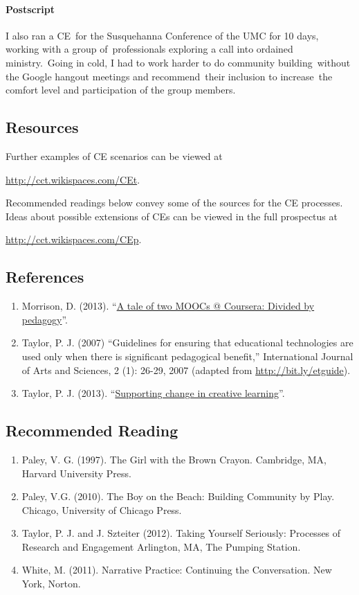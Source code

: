 \paragraph{Postscript}\label{postscript}

I also ran a CE~for the Susquehanna Conference of the UMC for 10 days,
working with a group of~professionals exploring a call into ordained
ministry.~Going in cold, I had to work harder to do community
building~without the Google hangout meetings and recommend~their
inclusion to increase~the comfort level and participation of the group
members.

\subsection{Resources}\label{resources}

Further examples of CE scenarios can be viewed at

\url{http://cct.wikispaces.com/CEt}.

\noindent Recommended readings below convey some of the sources for the CE
processes.~ Ideas about possible extensions of CEs can be viewed in the
full prospectus at

\url{http://cct.wikispaces.com/CEp}.

\subsection{References}\label{references}

\begin{enumerate}
\def\labelenumi{\arabic{enumi}.}
\item
  Morrison, D. (2013). ``\href{http://bit.ly/164uqkJ}{A tale of two
  MOOCs @ Coursera: Divided by pedagogy}''.
\item
  Taylor, P. J. (2007) ``Guidelines for ensuring that educational
  technologies are used only when there is significant pedagogical
  benefit,'' International Journal of Arts and Sciences, 2 (1): 26-29,
  2007 (adapted from \url{http://bit.ly/etguide}).
\item
  Taylor, P. J. (2013). ``\href{http://wp.me/p1gwfa-vv}{Supporting
  change in creative learning}''.
\end{enumerate}

\subsection{Recommended Reading}\label{recommended-reading}

\begin{enumerate}
\def\labelenumi{\arabic{enumi}.}
\item
  Paley, V. G. (1997). The Girl with the Brown Crayon. Cambridge, MA,
  Harvard University Press.
\item
  Paley, V.G. (2010). The Boy on the Beach: Building Community by Play.
  Chicago, University of Chicago Press.
\item
  Taylor, P. J. and J. Szteiter (2012). Taking Yourself Seriously:
  Processes of Research and Engagement Arlington, MA, The Pumping
  Station.
\item
  White, M. (2011). Narrative Practice: Continuing the Conversation. New
  York, Norton.
\end{enumerate}
